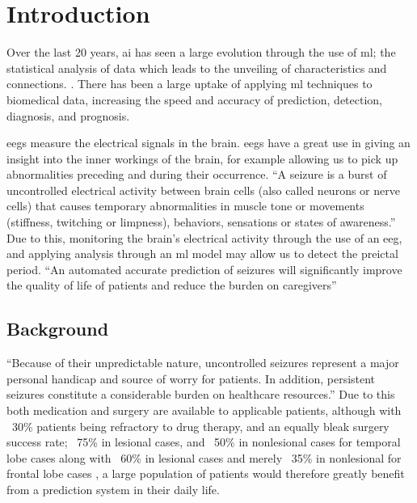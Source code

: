 \documentclass[12pt]{article}
\begin{document}
\section{Introduction}


Over the last 20 years, \acrfull{ai} has seen a large evolution through the use of \acrfull{ml}; the statistical analysis of data which leads to the unveiling of characteristics and connections. \cite{awad2015efficient}. There has been a large uptake of applying \acrshort{ml} techniques to biomedical data, increasing the speed and accuracy of prediction, detection, diagnosis, and prognosis. 

\acrfull{eegs} measure the electrical signals in the brain. \acrshort{eegs} have a great use in giving an insight into the inner workings of the brain, for example allowing us to pick up abnormalities preceding and during their occurrence. ``A seizure is a burst of uncontrolled electrical activity between brain cells (also called neurons or nerve cells) that causes temporary abnormalities in muscle tone or movements (stiffness, twitching or limpness), behaviors, sensations or states of awareness.'' \cite{johnHopkinsTypesOfSeizures} Due to this, monitoring the brain's electrical activity through the use of an \acrshort{eeg}, and applying analysis through an \acrshort{ml} model may allow us to detect the preictal period. ``An automated accurate prediction of seizures will significantly improve the quality of life of patients and reduce the burden on caregivers'' \cite{acharya2018automated}


\subsection{Background}

``Because of their unpredictable nature, uncontrolled seizures represent a major personal handicap and source of worry for patients. In addition, persistent seizures constitute a considerable burden on healthcare resources.'' \cite{assi2017towards} Due to this both medication and surgery are available to applicable patients, although with ~30\% patients being refractory to drug therapy, and an equally bleak surgery success rate; ~75\% in lesional cases, and ~50\% in nonlesional cases for temporal lobe cases along with ~60\% in lesional cases and merely ~35\% in nonlesional for frontal lobe cases \cite{assi2017towards}, a large population of patients would therefore greatly benefit from a prediction system in their daily life. 
\end{document}
